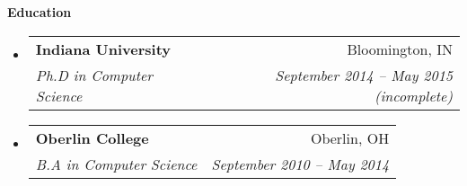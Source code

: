 \documentclass[letterpaper,11pt]{article}
\makeatletter
\newcommand{\resheading}[1]{{\large{\begin{minipage}{\textwidth}{\textbf{#1\vphantom{p\^{E}}}}\end{minipage}}}}
\newcommand{\ressubheading}[4]{
  \begin{tabular*}{6.5in}{l@{\extracolsep{\fill}}r}
    \textbf{#1} & #2 \\
    \textit{#3} & \textit{#4} \\
  \end{tabular*}\vspace{-6pt}}
\makeatother
\begin{document}
\resheading{Education}
\begin{itemize}
\item
  \ressubheading{Indiana University}{Bloomington, IN}{Ph.D in Computer Science}{September 2014 -- May 2015 (incomplete)}
\item
  \ressubheading{Oberlin College}{Oberlin, OH}{B.A in Computer Science}{September 2010 -- May 2014}
\end{itemize}

\end{document}

